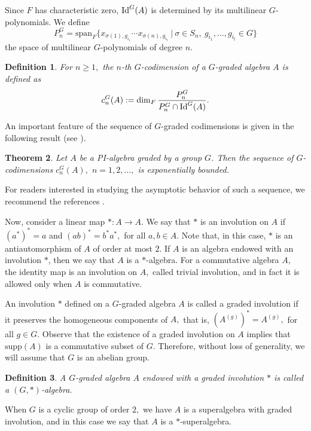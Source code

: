 \documentclass{amsart}
\newcommand{\Idg}{\ensuremath{\textnormal{Id}^{G}}}
\newtheorem{teorema}{Theorem}[section]
\newtheorem{definicao}[teorema]{Definition}
\numberwithin{equation}{section}
\begin{document}
 Since $F$ has characteristic zero, $\Idg(A)$ is determined by its multilinear $G$-polynomials. We define  
$$P_n^G=\mbox{span}_F\{x_{\sigma(1),g_{i_1}}\cdots x_{\sigma(n),g_{i_t}}~|~\sigma \in S_n, ~g_{i_1}, \ldots, g_{i_t} \in G\}$$ 
the space of multilinear $G$-polynomials of degree $n.$ 





\begin{definicao}
    For $n\ge 1,$ the $n$-th $G$-codimension of a $G$-graded algebra $A$ is defined as $$c_n^{G}(A):=\dim_F\frac{P_n^{G}}{P_n^{G}\cap \Idg(A)}. $$ 
\end{definicao}

An important feature of the sequence of $G$-graded codimensions is given in the following result (see \cite{GR}).
\begin{teorema}\label{regev} Let $A$ be a PI-algebra graded by a group $G$. Then the sequence of $G$-codimensions
$c^G_n (A),$ $n = 1, 2, \ldots ,$ is exponentially bounded.
\end{teorema}


For readers interested in studying the asymptotic behavior of such a sequence, we recommend the references \cite{ Plamen, V}.


Now, consider a linear map $* : A \to A.$ We say that $*$ is an involution on $A$ if $(a^*)^* = a$
and $(ab)^* = b^*a^*,$ for all $a, b \in A.$ Note that, in this case, $*$ is an antiautomorphism
of $A$ of order at most $2.$ If $A$ is an algebra endowed with an involution $*$, then
we say that $A$ is a $*$-algebra. For a commutative algebra $A,$ the identity map
is an involution on $A,$ called trivial involution, and in fact it is allowed only
when $A$ is commutative.

An involution $*$ defined on a $G$-graded algebra $A$ is called a graded involution if it preserves the homogeneous
components of $A,$ that is, $(A^{(g)})^* = A^{(g)},$ for all $g \in G.$ Observe that the existence of a graded involution on
$A$ implies that $\mbox{supp}(A)$ is a commutative subset of $G.$ Therefore, without loss of generality, we will assume
that $G$ is an abelian group.

\begin{definicao} A $G$-graded algebra $A$ endowed with a graded involution $*$ is called a $(G, *)$-algebra.
\end{definicao}
When $G$ is a cyclic group of order $2,$ we have $A$ is a superalgebra with
graded involution, and in this case we say that $A$ is a $*$-superalgebra.
\end{document}
